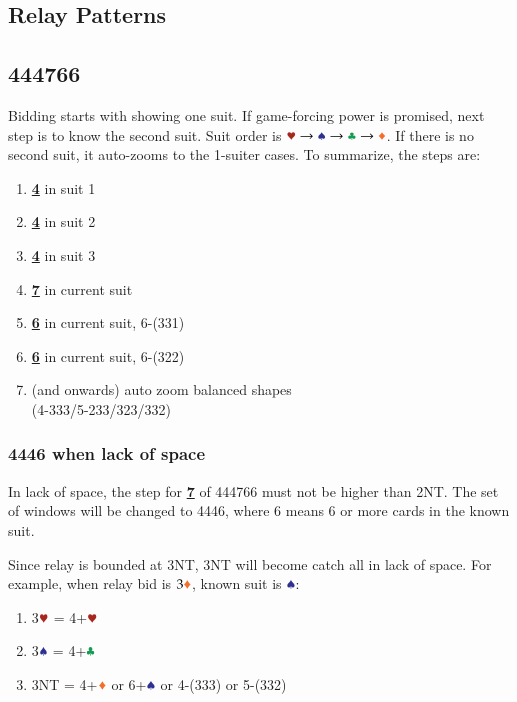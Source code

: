\documentclass{article}
\newcommand*{\ccc}{\textcolor{ForestGreen}{\clubsuit}}
\newcommand*{\ddd}{\textcolor{Orange}{\vardiamondsuit}}
\newcommand*{\hhh}{\textcolor{Mahogany}{\varheartsuit}}
\newcommand*{\sss}{\textcolor{Blue}{\spadesuit}}
\begin{document}
\begin{multicols}{2}
\section{Relay Patterns}
\subsection{444766}
Bidding starts with showing one suit. If game-forcing power is promised, next step is to know the second suit.
Suit order is $\hhh \rightarrow \sss \rightarrow \ccc \rightarrow \ddd$. If there is no second suit, it auto-zooms to the 1-suiter cases. To summarize, the steps are:

\begin{enumerate}
    \setlength\itemsep{-0.2em}
    \item \textbf{\underline{4}} in suit 1
    \item \textbf{\underline{4}} in suit 2
    \item \textbf{\underline{4}} in suit 3
    \item \textbf{\underline{7}} in current suit
    \item \textbf{\underline{6}} in current suit, 6-(331)
    \item \textbf{\underline{6}} in current suit, 6-(322)
    \item (and onwards) auto zoom balanced shapes \\
        (4-333/5-233/323/332)
\end{enumerate}

\subsubsection{4446 when lack of space}
In lack of space, the step for \textbf{\underline{7}} of 444766 must not be higher than 2NT. The set of windows will be changed to 4446, where 6 means 6 or more cards in the known suit.

\noindent Since relay is bounded at 3NT, 3NT will become catch all in lack of space. For example, when relay bid is $3\ddd$, known suit is $\sss$:
\begin{enumerate}
    \setlength\itemsep{-0.2em}
    \item 3$\hhh$ = 4+$\hhh$
    \item 3$\sss$ = 4+$\ccc$
    \item 3NT = 4+$\ddd$ or 6+$\sss$ or 4-(333) or 5-(332)
\end{enumerate}

\pagebreak


\end{multicols}
\end{document}

